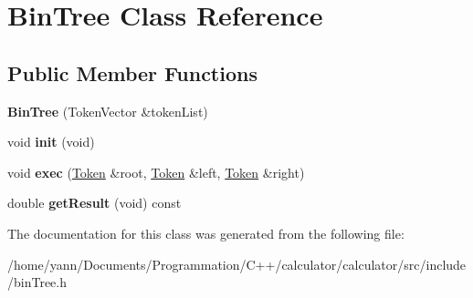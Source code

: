 \hypertarget{class_bin_tree}{\section{Bin\-Tree Class Reference}
\label{class_bin_tree}
}
\subsection*{Public Member Functions}
\begin{DoxyCompactItemize}
\item 
\hypertarget{class_bin_tree_acccd45fd06fa6629d4f0b78246b06f63}{{\bfseries Bin\-Tree} (Token\-Vector \&token\-List)}\label{class_bin_tree_acccd45fd06fa6629d4f0b78246b06f63}

\item 
\hypertarget{class_bin_tree_ac573447f4f0f056b29d36f4b585034d6}{void {\bfseries init} (void)}\label{class_bin_tree_ac573447f4f0f056b29d36f4b585034d6}

\item 
\hypertarget{class_bin_tree_aabd8fc4955f4a2d87ac33ca2fb8d3315}{void {\bfseries exec} (\hyperlink{class_token}{Token} \&root, \hyperlink{class_token}{Token} \&left, \hyperlink{class_token}{Token} \&right)}\label{class_bin_tree_aabd8fc4955f4a2d87ac33ca2fb8d3315}

\item 
\hypertarget{class_bin_tree_a85c7135e307c8f847e3572e4b9612615}{double {\bfseries get\-Result} (void) const }\label{class_bin_tree_a85c7135e307c8f847e3572e4b9612615}

\end{DoxyCompactItemize}


The documentation for this class was generated from the following file\-:\begin{DoxyCompactItemize}
\item 
/home/yann/\-Documents/\-Programmation/\-C++/calculator/calculator/src/include/bin\-Tree.\-h\end{DoxyCompactItemize}
